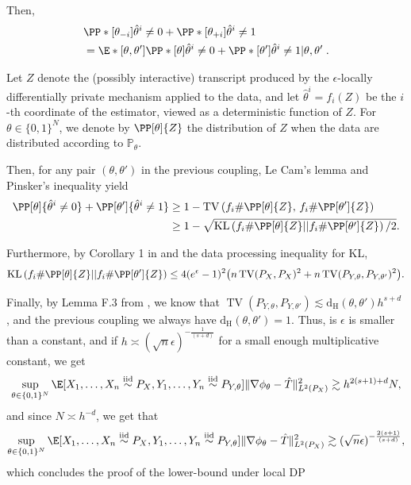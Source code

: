 \documentclass{article}
\DeclareMathOperator{\kl}{KL}
\DeclareMathOperator{\tv}{TV}
\newcommand{\1}{\mathds{1}}
\newcommand{\iid}{\stackrel{\text{iid}}{\sim}}
\newcommand{\ham}{\mathrm{d}_{\mathrm{H}}}
\DeclarePairedDelimiter{\paren}{\lparen}{\rparen}
\theoremstyle{plain}
\theoremstyle{definition}
\theoremstyle{remark}
\begin{document}
    Then,
    \begin{equation}
        \begin{aligned}
            &\PP*[{{\theta_{-i}}}] {\hat{\theta}^i \neq 0} + \PP*[{{\theta_{+i}}}] {\hat{\theta}^i \neq 1}\\
            &=
            \E*[\theta, \theta'] { \PP*[{{\theta}}] {\hat{\theta}^i \neq 0} + \PP*[{{\theta'}}] {\hat{\theta}^i \neq 1} | \theta, \theta'} \;.
        \end{aligned}
    \end{equation}


Let $Z$ denote the (possibly interactive) transcript produced by the
$\epsilon$-locally differentially private mechanism applied to the data, and
let $\hat{\theta}^i = f_i(Z)$ be the $i$-th coordinate of the estimator, viewed as
a deterministic function of $Z$. For $\theta \in \{0,1\}^N$, we denote by
$\PP[\theta]{Z}$ the distribution of $Z$ when the data are distributed according
to $\mathbb P_{\theta}$.

Then, for any pair $(\theta,\theta')$ in the previous coupling, Le Cam's lemma and
Pinsker's inequality yield
\begin{equation}
\begin{aligned}
    \PP[\theta]{\hat{\theta}^i \neq 0} + \PP[\theta']{\hat{\theta}^i \neq 1}
    &\geq 1 - \tv \left(f_i \# \PP[\theta]{Z},\, f_i\# \PP[\theta']{Z}\right) \\
    &\geq 1 - \sqrt{\kl \left(f_i\# \PP[\theta]{Z} || f_i\# \PP[\theta']{Z}\right)/2}.
\end{aligned}
\end{equation}



Furthermore, by Corollary 1 in \cite{duchi2013local} and the data processing inequality \cite{van2014renyi} for KL,
\begin{equation}
    \kl \left(f_i\# \PP[\theta]{Z} || f_i\# \PP[\theta']{Z}\right)
    \leq 
    4 (e^{\epsilon}-1)^2 \paren*{n \tv (P_X, P_X)^2 + n \tv (P_{Y, \theta}, P_{Y, \theta'})^2} .
\end{equation}

Finally, by Lemma F.3 from \cite{lalanne2025PrivateOTMaps}, we know that 
$\tv (P_{Y, \theta}, P_{Y, \theta'}) \lesssim \ham(\theta, \theta') h^{s + d}$ , and the previous coupling we always have $\ham(\theta, \theta') = 1$. Thus, is $\epsilon$ is smaller than a constant, and if $h \asymp (\sqrt n \epsilon)^{-\frac{1}{(s+d)}}$ for a small enough multiplicative constant, we get
\begin{equation}
    \sup_{\theta \in \{0, 1 \}^{N}} 
        \E[X_1, \dots, X_n \iid P_X, Y_1, \dots, Y_n \iid P_{Y, \theta}]{\|\nabla \phi_{\theta} - \hat{T} \|_{L^2(P_X)}^2 }
        \gtrsim h^{2 (s+1) + d} N ,
\end{equation}
and since $N \asymp h^{-d}$, we get that 
\begin{equation}
    \sup_{\theta \in \{0, 1 \}^{N}} 
        \E[X_1, \dots, X_n \iid P_X, Y_1, \dots, Y_n \iid P_{Y, \theta}]{\|\nabla \phi_{\theta} - \hat{T} \|_{L^2(P_X)}^2 }
        \gtrsim (\sqrt n \epsilon)^{-\frac{2 (s+1)}{(s+d)}} ,
\end{equation}
which concludes the proof of the lower-bound under local DP
\end{document}
